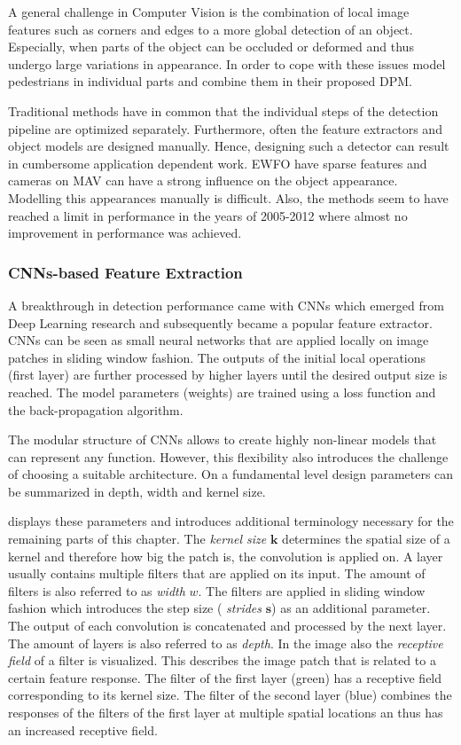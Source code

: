A general challenge in Computer Vision is the combination of local image features such as corners and edges to a more global detection of an object. Especially, when parts of the object can be occluded or deformed and thus undergo large variations in appearance. In order to cope with these issues \citeauthor{Felzenszwalb} \cite{Felzenszwalb} model pedestrians in individual parts and combine them in their proposed \ac{DPM}.

Traditional methods have in common that the individual steps of the detection pipeline are optimized separately. Furthermore, often the feature extractors and object models are designed manually. Hence, designing such a detector can result in cumbersome application dependent work. \ac{EWFO} have sparse features and cameras on \ac{MAV} can have a strong influence on the object appearance. Modelling this appearances manually is difficult. Also, the methods seem to have reached a limit in performance in the years of 2005-2012 where almost no improvement in performance was achieved.

\subsubsection{\acp{CNN}-based Feature Extraction}

A breakthrough in detection performance came with \acp{CNN} which emerged from Deep Learning research and subsequently became a popular feature extractor. \acp{CNN} can be seen as small neural networks that are applied locally on image patches in sliding window fashion. The outputs of the initial local operations (first layer) are further processed by higher layers until the desired output size is reached. The model parameters (weights) are trained using a loss function and the back-propagation algorithm.

The modular structure of \acp{CNN} allows to create highly non-linear models that can represent any function. However, this flexibility also introduces the challenge of choosing a suitable architecture. On a fundamental level design parameters can be summarized in depth, width and kernel size. 

 displays these parameters and introduces additional terminology necessary for the remaining parts of this chapter. The \textit{kernel size} $\textbf{k}$ determines the spatial size of a kernel and therefore how big the patch is, the convolution is applied on. A layer usually contains multiple filters that are applied on its input. The amount of filters is also referred to as \textit{width} $w$. The filters are applied in sliding window fashion which introduces the step size ( \textit{strides} $\mathbf{s}$) as an additional parameter. The output of each convolution is concatenated and processed by the next layer. The amount of layers is also referred to as \textit{depth}. In the image also the \textit{receptive field} of a filter is visualized. This describes the image patch that is related to a certain feature response. The filter of the first layer (green) has a receptive field corresponding to its kernel size. The filter of the second layer (blue) combines the responses of the filters of the first layer at multiple spatial locations an thus has an increased receptive field.

